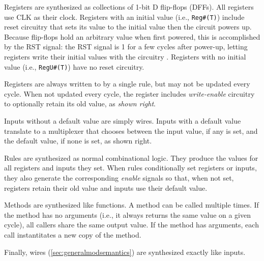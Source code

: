 Registers are synthesized as collections of 1-bit D flip-flops (DFFs).
All registers use CLK as their clock.
Registers with an initial value (i.e., \verb|Reg#(T)|) include reset circuitry
that sets its value to the initial value then the circuit powers up.
Because flip-flops hold an arbitrary value when first powered, this is accomplished by
the RST signal: the RST signal is 1 for a few cycles after power-up,
letting registers write their initial values with the circuitry .
Registers with no initial value (i.e., \verb|RegU#(T)|) have no reset circuitry.

Registers are always written to by a single rule, but may not be updated every cycle.
When not updated every cycle, the register includes \emph{write-enable} circuitry
to optionally retain its old value, as \emph{shown right}.

Inputs without a default value are simply wires.
Inputs with a default value translate to a multiplexer that chooses between
the input value, if any is set, and the default value, if none is set, as shown right.

Rules are synthesized as normal combinational logic.
They produce the values for all registers and inputs they set.
When rules conditionally set registers or inputs,
they also generate the corresponding \emph{enable} signals
so that, when not set, registers retain their old value
and inputs use their default value.

Methods are synthesized like functions.
A method can be called multiple times. If the method has no arguments
(i.e., it always returns the same value on a given cycle),
all callers share the same output value. If the method has arguments,
each call instantitates a new copy of the method.

Finally, wires (\autoref{sec:generalmodsemantics})
are synthesized exactly like inputs.

